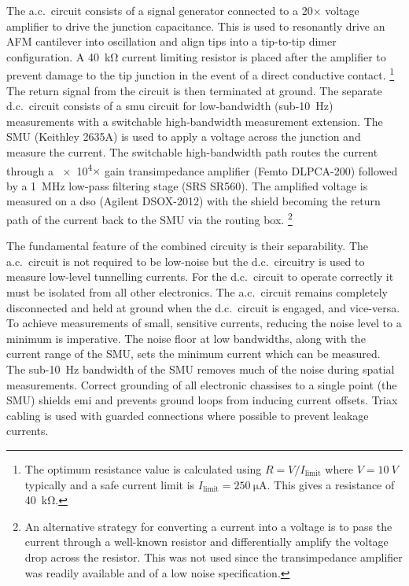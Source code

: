 \documentclass{article}
\begin{document}
The a.c.\ circuit consists of a signal generator connected to a 20$\times$ voltage amplifier to drive the junction capacitance. This is used to resonantly drive an AFM cantilever into oscillation and align tips into a tip-to-tip dimer configuration. A \SI{40}{\kilo\ohm} current limiting resistor is placed after the amplifier to prevent damage to the tip junction in the event of a direct conductive contact.%
\footnote{The optimum resistance value is calculated using $R = V/I_{\mathrm{limit}}$ where $V=\SI{10}{V}$ typically and a safe current limit is $I_{\mathrm{limit}}=\SI{250}{\micro\ampere}$. This gives a resistance of \SI{40}{\kilo\ohm}.}
The return signal from the circuit is then terminated at ground. The separate d.c.\ circuit consists of a \gls{smu} circuit for low-bandwidth (sub-\SI{10}{Hz}) measurements with a switchable high-bandwidth measurement extension. The SMU (Keithley 2635A) is used to apply a voltage across the junction and measure the current. The switchable high-bandwidth path routes the current through a \num{e4}$\times$ gain transimpedance amplifier (Femto DLPCA-200) followed by a \SI{1}{MHz} low-pass filtering stage (SRS SR560). The amplified voltage is measured on a \gls{dso} (Agilent DSOX-2012) with the shield becoming the return path of the current back to the SMU via the routing box.%
\footnote{An alternative strategy for converting a current into a voltage is to pass the current through a well-known resistor and differentially amplify the voltage drop across the resistor. This was not used since the transimpedance amplifier was readily available and of a low noise specification.}

The fundamental feature of the combined circuity is their separability. The a.c.\ circuit is not required to be low-noise but the d.c.\ circuitry is used to measure low-level tunnelling currents. For the d.c.\ circuit to operate correctly it must be isolated from all other electronics. The a.c.\ circuit remains completely disconnected and held at ground when the d.c.\ circuit is engaged, and vice-versa.
To achieve measurements of small, sensitive currents, reducing the noise level to a minimum is imperative. The noise floor at low bandwidths, along with the current range of the SMU, sets the minimum current which can be measured. The sub-\SI{10}{Hz} bandwidth of the SMU removes much of the noise during spatial measurements. Correct grounding of all electronic chassises to a single point (the SMU) shields \gls{emi} and prevents ground loops from inducing current offsets. Triax cabling is used with guarded connections where possible to prevent leakage currents.
\end{document}
